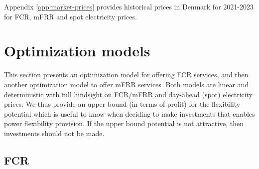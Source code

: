 \documentclass[sigconf]{acmart}
\begin{document}
Appendix \ref{app:market-prices} provides historical prices in Denmark for 2021-2023 for FCR, mFRR and spot electricity prices.


\section{Optimization models}
This section presents an optimization model for offering FCR services, and then another optimization model to offer mFRR services.
Both models are linear and deterministic with full hindsight on FCR/mFRR and day-ahead (spot) electricity prices. We thus provide an upper bound (in terms of profit) for the flexibility potential which is useful to know when deciding to make investments that enables power flexibility provision. If the upper bound potential is not attractive, then investments should not be made.

\subsection{FCR}
\end{document}
